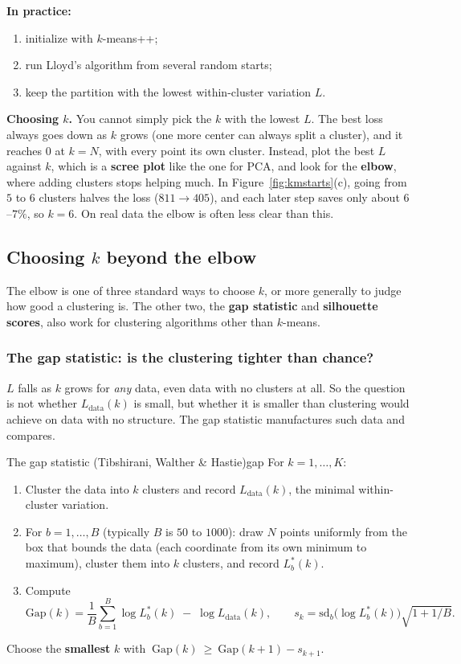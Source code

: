 \documentclass[11pt]{article}
\begin{document}
\textbf{In practice:}
\begin{enumerate}[nosep]
\item initialize with $k$-means++;
\item run Lloyd's algorithm from several random starts;
\item keep the partition with the lowest within-cluster variation $L$.
\end{enumerate}

\textbf{Choosing $k$.} You cannot simply pick the $k$ with the lowest $L$. The best loss always goes down as $k$ grows (one more center can always split a cluster), and it reaches $0$ at $k=N$, with every point its own cluster. Instead, plot the best $L$ against $k$, which is a \textbf{scree plot} like the one for PCA, and look for the \textbf{elbow}, where adding clusters stops helping much. In Figure~\ref{fig:kmstarts}(c), going from $5$ to $6$ clusters halves the loss ($811\to405$), and each later step saves only about $6$--$7\%$, so $k=6$. On real data the elbow is often less clear than this.

\subsection{Choosing $k$ beyond the elbow}

The elbow is one of three standard ways to choose $k$, or more generally to judge how good a clustering is. The other two, the \textbf{gap statistic} and \textbf{silhouette scores}, also work for clustering algorithms other than $k$-means.

\subsubsection*{The gap statistic: is the clustering tighter than chance?}

$L$ falls as $k$ grows for \emph{any} data, even data with no clusters at all. So the question is not whether $L_{\mathrm{data}}(k)$ is small, but whether it is smaller than clustering would achieve on data with no structure. The gap statistic manufactures such data and compares.

\begin{algorithm}{The gap statistic (Tibshirani, Walther \& Hastie)}{gap}
For $k=1,\dots,K$:
\begin{enumerate}[nosep,label=\arabic*)]
\item Cluster the data into $k$ clusters and record $L_{\mathrm{data}}(k)$, the minimal within-cluster variation.
\item For $b=1,\dots,B$ (typically $B$ is $50$ to $1000$): draw $N$ points uniformly from the box that bounds the data (each coordinate from its own minimum to maximum), cluster them into $k$ clusters, and record $L^{*}_b(k)$.
\item Compute
\[
\mathrm{Gap}(k)=\frac1B\sum_{b=1}^B\log L^{*}_b(k)\;-\;\log L_{\mathrm{data}}(k),
\qquad s_k=\mathrm{sd}_b\big(\log L^{*}_b(k)\big)\sqrt{1+1/B}.
\]
\end{enumerate}
Choose the \textbf{smallest} $k$ with $\ \mathrm{Gap}(k)\ \ge\ \mathrm{Gap}(k+1)-s_{k+1}$.
\end{algorithm}
\end{document}
